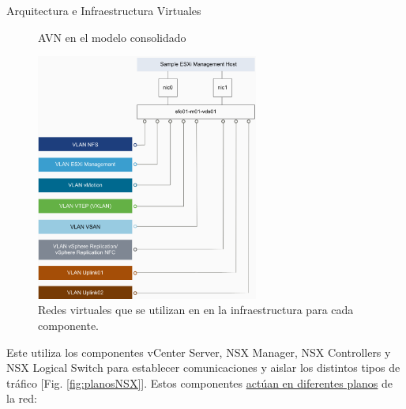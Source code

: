 \begin{subsection}{Arquitectura e Infraestructura Virtuales\cite{CFVirtInfraes}}
\begin{figure}[h!]
  \caption{AVN en el modelo consolidado}
  \label{fig:avnConsolidated}
\end{figure}
\FloatBarrier



\iffalse
\begin{figure}[h!]
  \centering
  \includegraphics[width=0.65\textwidth]{imaxes/conceptosPrevios/redesVDSCluster.png}
  \caption{Redes virtuales que se utilizan en en la infraestructura para cada componente.}
  \label{fig:redesVirtuales}
\end{figure}
\FloatBarrier
Este utiliza los componentes vCenter Server, NSX Manager, NSX Controllers y NSX Logical Switch para establecer comunicaciones y aislar los distintos tipos de tráfico [Fig. \ref{fig:planosNSX}]. Estos componentes \underline{actúan en diferentes planos} de la red:




\end{subsection}
